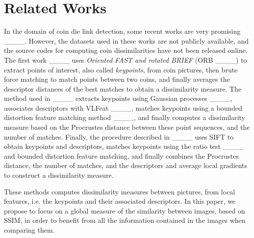 \section{Related Works}
\label{sec:rw}

In the domain of coin die link detection, some recent works are very promising ____.
However, the datasets used in these works are not publicly available, and the source codes for computing coin dissimilarities have not been released online. The first work ____ uses \textit{Oriented FAST and rotated BRIEF} (ORB ____) to extract points of interest, also called \textit{keypoints}, from coin pictures, then brute force matching to match points between two coins, and finally averages the descriptor distances of the best matches to obtain a dissimilarity measure. The method used in ____ extracts keypoints using Gaussian processes ____, associates descriptors with VLFeat ____, matches keypoints using a bounded distortion feature matching method ____, and finally computes a dissimilarity measure based on the Procrustes distance between these point sequences, and the number of matches. Finally, the procedure described in ____ uses SIFT to obtain keypoints and descriptors, matches keypoints using the ratio test ____ and bounded distortion feature matching, and finally combines the Procrustes distance, the number of matches, and the descriptors and average local gradients to construct a dissimilarity measure.

These methods computes dissimilarity measures between pictures, from local features, i.e. the keypoints and their associated descriptors. In this paper, we propose to focus on a global measure of the similarity between images, based on SSIM, in order to benefit from all the information contained in the images when comparing them.